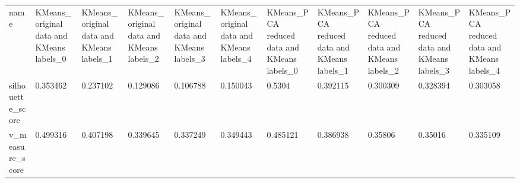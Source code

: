 \begin{tabular}{lllllllllll}
name                  &           KMeans\_original data and KMeans labels\_0 &           KMeans\_original data and KMeans labels\_1 &           KMeans\_original data and KMeans labels\_2 &           KMeans\_original data and KMeans labels\_3 &           KMeans\_original data and KMeans labels\_4 &        KMeans\_PCA reduced data and KMeans labels\_0 &        KMeans\_PCA reduced data and KMeans labels\_1 &        KMeans\_PCA reduced data and KMeans labels\_2 &        KMeans\_PCA reduced data and KMeans labels\_3 &        KMeans\_PCA reduced data and KMeans labels\_4 \\
silhouette\_score      &                                           0.353462 &                                           0.237102 &                                           0.129086 &                                           0.106788 &                                           0.150043 &                                             0.5304 &                                           0.392115 &                                           0.300309 &                                           0.328394 &                                           0.303058 \\
v\_measure\_score       &                                           0.499316 &                                           0.407198 &                                           0.339645 &                                           0.337249 &                                           0.349443 &                                           0.485121 &                                           0.386938 &                                            0.35806 &                                            0.35016 &                                           0.335109 \\
\bottomrule
\end{tabular}
